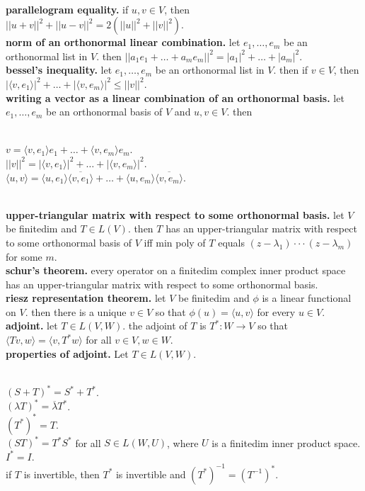 	\\ \textbf{parallelogram equality. } if $u,v \in V$, then $||u+v||^2 + ||u-v||^2 = 2(||u||^2 + ||v||^2)$. 
	\\ \textbf{norm of an orthonormal linear combination. } let $e_1,\dots,e_m$ be an orthonormal list in $V$. then $||a_1e_1 + \dots + a_me_m||^2 = |a_1|^2 + \dots + |a_m|^2$. 
	\\ \textbf{bessel's inequality. } let $e_1,\dots,e_m$ be an orthonormal list in $V$. then if $v \in V$, then $|\langle v,e_1 \rangle|^2 + \dots + |\langle v,e_m \rangle|^2 \leq ||v||^2$. 
	\\ \textbf{writing a vector as a linear combination of an orthonormal basis. } let $e_1,\dots,e_m$ be an orthonormal basis of $V$ and $u,v \in V$. then 
	\begin{enumerate}
		\\ $v = \langle v,e_1 \rangle e_1 + \dots + \langle v,e_m \rangle e_m$. 
		\\ $||v||^2 = |\langle v,e_1 \rangle|^2 + \dots + |\langle v,e_m \rangle|^2$. 
		\\ $\langle u,v \rangle = \langle u,e_1 \rangle \overline{\langle v,e_1 \rangle} + \dots + \langle u,e_m \rangle \overline{\langle v,e_m \rangle}$. 
	\end{enumerate}
	\\ \textbf{upper-triangular matrix with respect to some orthonormal basis. } let $V$ be finitedim and $T \in L(V)$. then $T$ has an upper-triangular matrix with respect to some orthonormal basis of $V$ iff min poly of $T$ equals $(z-\lambda_1) \cdot \cdot \cdot (z-\lambda_m)$ for some $m$. 
	\\ \textbf{schur's theorem. } every operator on a finitedim complex inner product space has an upper-triangular matrix with respect to some orthonormal basis. 
	\\ \textbf{riesz representation theorem. } let $V$ be finitedim and $\phi$ is a linear functional on $V$. then there is a unique $v \in V$ so that $\phi(u) = \langle u,v \rangle$ for every $u \in V$. 
	\\ \textbf{adjoint. } let $T \in L(V,W)$. the adjoint of $T$ is $T^*: W \to V$ so that $\langle Tv,w \rangle = \langle v,T^*w \rangle$ for all $v \in V, w \in W$. 
	\\ \textbf{properties of adjoint. } Let $T \in L(V,W)$. 
	\begin{enumerate}
		\\ $(S+T)^* = S^*+T^*$. 
		\\ $(\lambda T)^* = \overline{\lambda}T^*$. 
		\\ $(T^*)^*=T$. 
		\\ $(ST)^* = T^*S^*$ for all $S \in L(W,U)$, where $U$ is a finitedim inner product space. 
		\\ $I^*=I$. 
		\\ if $T$ is invertible, then $T^*$ is invertible and $(T^*)^{-1} = (T^{-1})^*$.
	\end{enumerate}
